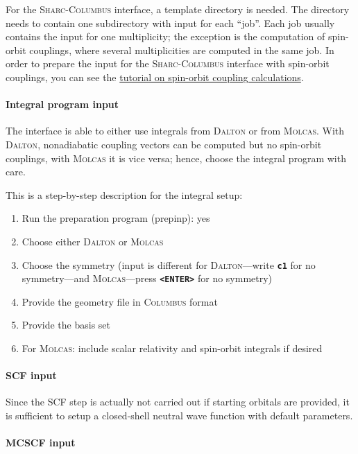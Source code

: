 \documentclass[a4paper,11pt,DIV=15,openany]{scrbook}
\newcommand{\link}[2]{\href{#1}{#2}}
\newcommand{\sharc}{\textsc{Sharc}}
\newcommand{\ttt}[1]{\textbf{\texttt{#1}}}
\begin{document}
For the \sharc-\textsc{Columbus} interface, a template directory is needed.
The directory needs to contain one subdirectory with input for each ``job''.
Each job usually contains the input for one multiplicity; the exception is the computation of spin-orbit couplings, where several multiplicities are computed in the same job.
In order to prepare the input for the \sharc-\textsc{Columbus} interface with spin-orbit couplings, you can see the 
\link{http://www.univie.ac.at/columbus/docs_COL70/tutorial-SO.pdf}{tutorial on spin-orbit coupling calculations}.

\paragraph{Integral program input}

The interface is able to either use integrals from \textsc{Dalton} or from \textsc{Molcas}.
With \textsc{Dalton}, nonadiabatic coupling vectors can be computed but no spin-orbit couplings, with \textsc{Molcas} it is vice versa; hence, choose the integral program with care.

This is a step-by-step description for the integral setup:
\begin{enumerate}
  \item Run the preparation program (prepinp): yes
  \item Choose either \textsc{Dalton} or \textsc{Molcas}
  \item Choose the symmetry (input is different for \textsc{Dalton}---write \ttt{c1} for no symmetry---and \textsc{Molcas}---press \ttt{<ENTER>} for no symmetry)
  \item Provide the geometry file in \textsc{Columbus} format
  \item Provide the basis set
  \item For \textsc{Molcas}: include scalar relativity and spin-orbit integrals if desired
\end{enumerate}

\paragraph{SCF input}

Since the SCF step is actually not carried out if starting orbitals are provided, it is sufficient to setup a closed-shell neutral wave function with default parameters.

\paragraph{MCSCF input}
\end{document}
